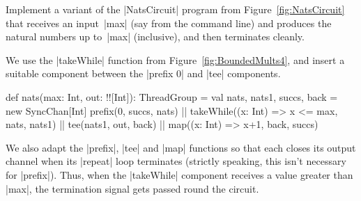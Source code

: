 \begin{questionS}
Implement a variant of the |NatsCircuit| program from
Figure~\ref{fig:NatsCircuit} that receives an input~|max| (say from the command
line) and produces the natural numbers up to~|max| (inclusive), and then
terminates cleanly.
\end{questionS}

\begin{answerS}
We use the |takeWhile| function from Figure~\ref{fig:BoundedMults4}, and
insert a suitable component between the |prefix 0| and |tee| components.  
\begin{scala}
  def nats(max: Int, out: !![Int]): ThreadGroup = {
    val nats, nats1, succs, back = new SyncChan[Int]
    prefix(0, succs, nats) || takeWhile((x: Int) => x <= max, nats, nats1) ||
      tee(nats1, out, back) || map((x: Int) => x+1, back, succs)
  }
\end{scala}
We also adapt the |prefix|, |tee| and |map| functions so that each closes its
output channel when its |repeat| loop terminates (strictly speaking, this
isn't necessary for |prefix|).  Thus, when the |takeWhile| component receives
a value greater than |max|, the termination signal gets passed round the
circuit.
\end{answerS}








